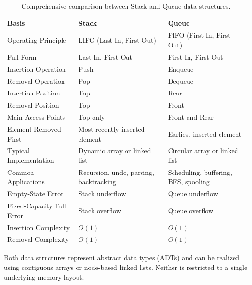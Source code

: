 \begin{table}[htbp]
\centering
\footnotesize
\begin{tabularx}{\textwidth}{l X X}
\toprule
\textbf{Basis} & \textbf{Stack} & \textbf{Queue} \\
\midrule
Operating Principle             & LIFO (Last In, First Out)               & FIFO (First In, First Out) \\
Full Form                       & Last In, First Out                      & First In, First Out \\
Insertion Operation             & Push                                    & Enqueue \\
Removal Operation               & Pop                                     & Dequeue \\
Insertion Position              & Top                                     & Rear \\
Removal Position                & Top                                     & Front \\
Main Access Points              & Top only                                & Front and Rear \\
Element Removed First           & Most recently inserted element          & Earliest inserted element \\
Typical Implementation          & Dynamic array or linked list            & Circular array or linked list \\
Common Applications             & Recursion, undo, parsing, backtracking  & Scheduling, buffering, BFS, spooling \\
Empty-State Error               & Stack underflow                         & Queue underflow \\
Fixed-Capacity Full Error       & Stack overflow                          & Queue overflow \\
Insertion Complexity            & $O(1)$                                  & $O(1)$ \\
Removal Complexity              & $O(1)$                                  & $O(1)$ \\
\bottomrule
\end{tabularx}
\caption{Comprehensive comparison between Stack and Queue data structures.}
\end{table}

Both data structures represent abstract data types (ADTs) and can be realized using contiguous arrays or node-based linked lists. Neither is restricted to a single underlying memory layout.

